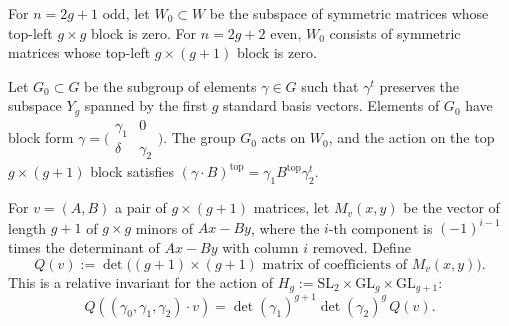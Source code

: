 \begin{definition}[Subspace \(W_0\)]
  \label{def:W_zero}
  For \(n=2g+1\) odd, let \(W_0\subset W\) be the subspace of
  symmetric matrices whose top-left \(g\times g\) block is zero.
  For \(n=2g+2\) even, \(W_0\) consists of symmetric matrices whose
  top-left \(g\times(g+1)\) block is zero.
\end{definition}

\begin{definition}[Subgroup \(G_0\)]
  \label{def:G_zero}
  Let \(G_0\subset G\) be the subgroup of elements \(\gamma\in G\)
  such that \(\gamma^t\) preserves the subspace \(Y_g\) spanned by
  the first \(g\) standard basis vectors.  Elements of \(G_0\) have
  block form
  \(\gamma=\bigl(\begin{smallmatrix}\gamma_1 & 0\\ \delta &
  \gamma_2\end{smallmatrix}\bigr)\).
  The group \(G_0\) acts on \(W_0\), and the action on the top
  \(g\times(g+1)\) block satisfies
  \((\gamma\cdot B)^{\mathrm{top}}=\gamma_1 B^{\mathrm{top}}\gamma_2^t\).
\end{definition}

\begin{definition}[\(Q\)-invariant on \(V_g\)]
  \label{def:Q_invariant_V}
  For \(v=(A,B)\) a pair of \(g\times(g+1)\) matrices, let
  \(M_v(x,y)\) be the vector of length \(g+1\) of \(g\times g\)
  minors of \(Ax-By\), where the \(i\)-th component is
  \((-1)^{i-1}\) times the determinant of \(Ax-By\) with column \(i\)
  removed.  Define
  \[
    Q(v):=\det\bigl(\text{$(g+1)\times(g+1)$ matrix of coefficients
    of $M_v(x,y)$}\bigr).
  \]
  This is a relative invariant for the action of
  \(H_g:=\mathrm{SL}_2\times\mathrm{GL}_g\times\mathrm{GL}_{g+1}\):
  \[
    Q((\gamma_0,\gamma_1,\gamma_2)\cdot v)
    =\det(\gamma_1)^{g+1}\det(\gamma_2)^g\,Q(v).
  \]
\end{definition}

